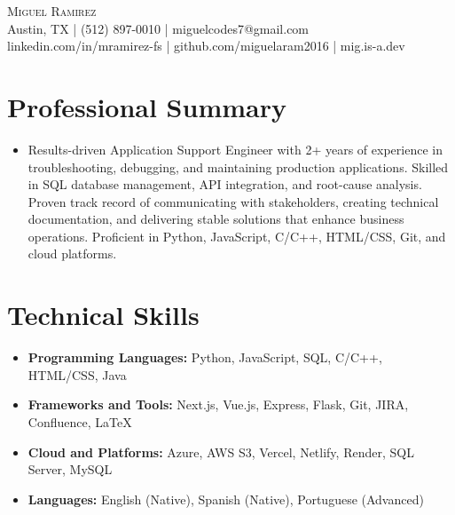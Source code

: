 \documentclass[letterpaper,10pt]{article}
\newcommand{\resumeItem}[1]{\item \small{#1}}
\begin{document}
\begin{center}
  {\Large \scshape Miguel Ramirez} \\ \vspace{0pt}
  Austin, TX | (512) 897-0010 | miguelcodes7@gmail.com \\ 
  linkedin.com/in/mramirez-fs | github.com/miguelaram2016 | mig.is-a.dev
\end{center}

\section*{Professional Summary}
\begin{itemize}
  \resumeItem{Results-driven Application Support Engineer with 2+ years of experience in troubleshooting, debugging, and maintaining production applications. Skilled in SQL database management, API integration, and root-cause analysis. Proven track record of communicating with stakeholders, creating technical documentation, and delivering stable solutions that enhance business operations. Proficient in Python, JavaScript, C/C++, HTML/CSS, Git, and cloud platforms.}
\end{itemize}

\section*{Technical Skills}
\begin{itemize}
  \resumeItem{\textbf{Programming Languages:} Python, JavaScript, SQL, C/C++, HTML/CSS, Java}
  \resumeItem{\textbf{Frameworks and Tools:} Next.js, Vue.js, Express, Flask, Git, JIRA, Confluence, LaTeX}
  \resumeItem{\textbf{Cloud and Platforms:} Azure, AWS S3, Vercel, Netlify, Render, SQL Server, MySQL}
  \resumeItem{\textbf{Languages:} English (Native), Spanish (Native), Portuguese (Advanced)}
\end{itemize}

\end{document}
